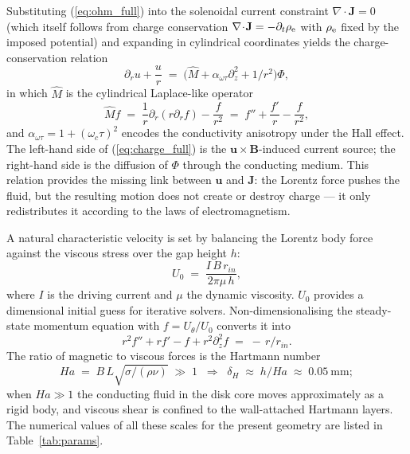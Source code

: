 \documentclass[aps,prl,twocolumn,superscriptaddress]{revtex4-2}
\begin{document}
Substituting (\ref{eq:ohm_full}) into the solenoidal current
constraint $\nabla\!\cdot\!\mathbf{J} = 0$ (which itself follows from
charge conservation $\nabla\!\cdot\!\mathbf{J} = -\partial_t\rho_{\rm e}$
with $\rho_{\rm e}$ fixed by the imposed potential) and expanding in
cylindrical coordinates yields the charge-conservation
relation~\cite{8}
\begin{equation}
\partial_r u + \frac{u}{r}
\;=\;\bigl(\hat{M} + \alpha_{\omega\tau}\partial_z^{2} + 1/r^{2}\bigr)\Phi,
\label{eq:charge_full}
\end{equation}
in which $\hat{M}$ is the cylindrical Laplace-like operator
\begin{equation}
\hat{M}f \;=\; \frac{1}{r}\partial_r(r\partial_r f) - \frac{f}{r^{2}}
   \;=\; f''+\frac{f'}{r}-\frac{f}{r^{2}},
\label{eq:Mhat}
\end{equation}
and $\alpha_{\omega\tau} = 1 + (\omega_c\tau)^{2}$ encodes the
conductivity anisotropy under the Hall effect.  The left-hand side of
(\ref{eq:charge_full}) is the $\mathbf{u}\!\times\!\mathbf{B}$-induced
current source; the right-hand side is the diffusion of $\Phi$
through the conducting medium.  This relation provides the missing
link between $\mathbf{u}$ and $\mathbf{J}$: the Lorentz force pushes
the fluid, but the resulting motion does not create or destroy charge
--- it only redistributes it according to the laws of
electromagnetism.

A natural characteristic velocity is set by balancing the Lorentz
body force against the viscous stress over the gap height $h$:
\begin{equation}
U_{0} \;=\; \frac{I\,B\,r_{in}}{2\pi\mu\,h},
\label{eq:U0_full}
\end{equation}
where $I$ is the driving current and $\mu$ the dynamic viscosity.
$U_{0}$ provides a dimensional initial guess for iterative solvers.
Non-dimensionalising the steady-state momentum equation with
$f = U_\theta/U_{0}$ converts it into
\begin{equation}
r^{2}f'' + r f' - f + r^{2}\partial_z^{2}f \;=\; -\,r/r_{in}.
\label{eq:f_eq}
\end{equation}
The ratio of magnetic to viscous forces is the Hartmann number
\begin{equation}
Ha \;=\; B\,L\sqrt{\sigma/(\rho\nu)}\;\gg\; 1
   \;\;\Longrightarrow\;\;
\delta_{H} \;\approx\; h/Ha \;\approx\; 0.05~\text{mm};
\label{eq:Ha_full}
\end{equation}
when $Ha \gg 1$ the conducting fluid in the disk core moves
approximately as a rigid body, and viscous shear is confined to the
wall-attached Hartmann layers.  The numerical values of all these
scales for the present geometry are listed in
Table~\ref{tab:params}.
\end{document}
